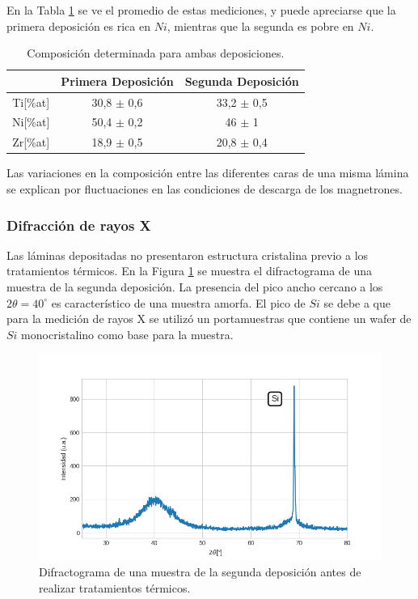 \documentclass[12pt]{article}
\theoremstyle{definition}
\theoremstyle{remark}
\begin{document}
{En la Tabla \ref{compositionAvg} se ve el promedio de estas mediciones, y puede apreciarse que la primera deposición es rica en $Ni$, mientras que la segunda es pobre en $Ni$.


\begin{table}[H]
\centering
\begin{tabular}{c|c|c|}
\cline{2-3}
\multicolumn{1}{l|}{} & Primera Deposición & Segunda Deposición \\ \hline
\multicolumn{1}{|c|}{Ti{[}\%at{]}} & 30,8 $\pm$ 0,6 & 33,2 $\pm$ 0,5 \\ \hline
\multicolumn{1}{|c|}{Ni{[}\%at{]}} & 50,4 $\pm$ 0,2 & 46 $\pm$ 1 \\ \hline
\multicolumn{1}{|c|}{Zr{[}\%at{]}} & 18,9 $\pm$ 0,5 & 20,8 $\pm$ 0,4 \\ \hline
\end{tabular}
\caption{Composición determinada para ambas deposiciones.}
\label{compositionAvg}
\end{table}

Las variaciones en la composición entre las diferentes caras de una misma lámina se explican por fluctuaciones en las condiciones de descarga de los magnetrones. 

\subsubsection{Difracción de rayos X}
Las láminas depositadas no presentaron estructura cristalina previo a los tratamientos térmicos. En la Figura \ref{amorfo} se muestra el difractograma de una muestra de la segunda deposición. La presencia del pico ancho cercano a los $2\theta=40^\circ$  es característico de una muestra amorfa. El pico de $Si$ se debe a que para la medición de rayos X se utilizó un portamuestras que contiene un wafer  de $Si$ monocristalino como base para la muestra.

\begin{figure}[H]
 	\centering
	\includegraphics[scale=0.6]{img/RX_amorfo.png}
 	\caption{Difractograma de una muestra de la segunda deposición antes de realizar tratamientos térmicos.}
	\label{amorfo}
\end{figure}


}
\end{document}

